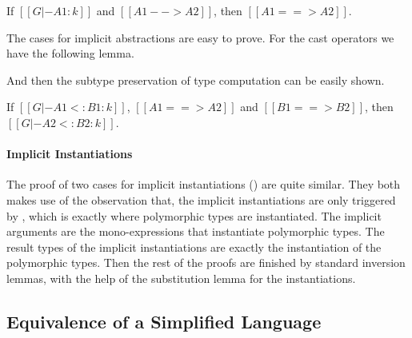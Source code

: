 \begin{lemma}
    If $[[G |- A1 : k]]$ and $[[A1 --> A2]]$,
    then $[[A1 ==> A2]]$.
\end{lemma}

The cases for implicit abstractions are easy to prove. For the cast operators
we have the following lemma.


And then the subtype preservation of type computation can be easily shown.

\begin{lemma}
    If $[[G |- A1 <: B1 : k]]$, $[[A1 ==> A2]]$ and $[[B1 ==> B2]]$,
    then $[[G |- A2 <: B2 : k]]$.
\end{lemma}


\paragraph{Implicit Instantiations}
The proof of two cases for implicit instantiations ()
are quite similar. They both makes use of the observation that, the implicit
instantiations are only triggered by , which is exactly where
polymorphic types are instantiated. The implicit arguments are the
mono-expressions that instantiate polymorphic types. The result types of the
implicit instantiations are exactly the instantiation of the polymorphic types.
Then the rest of the proofs are finished by standard inversion lemmas,
with the help of the substitution lemma for the instantiations.

\subsection{Equivalence of a Simplified Language}

